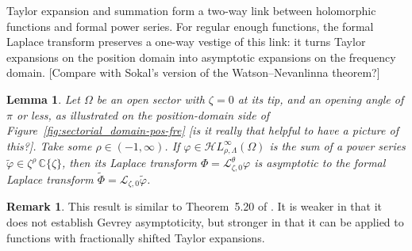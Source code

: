 \documentclass{article}
\newcommand{\singexp}[2]{\mathcal{H}L^\infty_{#1, #2}}
\newcommand{\C}{\mathbb{C}}
\newcommand{\series}[1]{\tilde{#1}}
\newcommand{\laplace}{\mathcal{L}}
\theoremstyle{definition}
\newtheorem{remark}[definition]{Remark}
\theoremstyle{plain}
\newtheorem{lemma}[definition]{Lemma}
\newenvironment{todo}{\color{Coral}}{\color{black}}
\begin{document}
Taylor expansion and summation form a two-way link between holomorphic functions and formal power series. For regular enough functions, the formal Laplace transform preserves a one-way vestige of this link: it turns Taylor expansions on the position domain into asymptotic expansions on the frequency domain. \begin{todo}[Compare with Sokal's version of the Watson--Nevanlinna theorem?]\end{todo}
\begin{lemma}\label{lem:laplace-bridge}
Let $\Omega$ be an open sector with $\zeta = 0$ at its tip, and an opening angle of $\pi$ or less\begin{todo}, as illustrated on the position-domain side of Figure~\ref{fig:sectorial_domain-pos-fre} [is it really that helpful to have a picture of this?]\end{todo}. Take some $\rho \in (-1,\infty)$. If $\varphi \in \singexp{\rho}{\Lambda}(\Omega)$ is the sum of a power series $\series{\varphi} \in \zeta^\rho\,\C\{\zeta\}$, then its Laplace transform $\Phi = \laplace_{\zeta, 0}^\theta \varphi$ is asymptotic to the formal Laplace transform $\series{\Phi} = \laplace_{\zeta, 0} \series{\varphi}$.
\end{lemma}
\begin{remark}
This result is similar to Theorem~5.20 of \cite{diverg-resurg-i}. It is weaker in that it does not establish Gevrey asymptoticity, but stronger in that it can be applied to functions with fractionally shifted Taylor expansions.
\end{remark}
\end{document}
